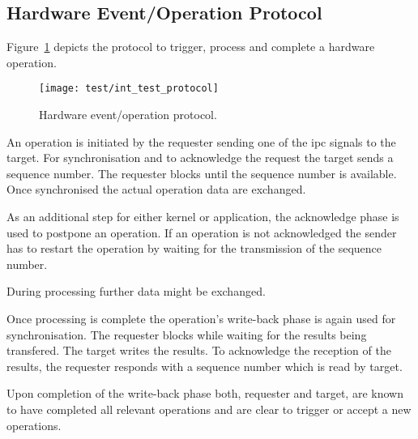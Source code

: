 	\subsection{Hardware Event/Operation Protocol}
		Figure~\ref{fig:int_test_protocol} depicts the protocol to trigger, process and complete a hardware operation.

		\begin{figure}[h]
			\centering	
			\texttt{[image: test/int\_test\_protocol]}
			\caption{Hardware event/operation protocol.}
			\label{fig:int_test_protocol}
		\end{figure}

		An operation is initiated by the requester sending one of the \gls{ipc} signals to the target. For synchronisation and to acknowledge the request the target sends a sequence number. The requester blocks until the sequence number is available. Once synchronised the actual operation data are exchanged.

		As an additional step for either kernel or application, the acknowledge phase is used to postpone an operation. If an operation is not acknowledged the sender has to restart the operation by waiting for the transmission of the sequence number.

		During processing further data might be exchanged.

		Once processing is complete the operation's write-back phase is again used for synchronisation. The requester blocks while waiting for the results being transfered. The target writes the results. To acknowledge the reception of the results, the requester responds with a sequence number which is read by target.

		Upon completion of the write-back phase both, requester and target, are known to have completed all relevant operations and are clear to trigger or accept a new operations.
